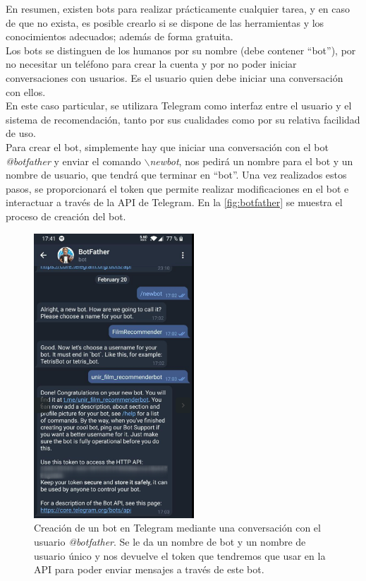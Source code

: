 En resumen, existen bots para realizar prácticamente cualquier tarea, y en caso de que no exista, es posible crearlo si se dispone de las herramientas y los conocimientos adecuados; además de forma gratuita.\\

Los bots se distinguen de los humanos por su nombre (debe contener ``bot''), por no necesitar un teléfono para crear la cuenta y por no poder iniciar conversaciones con usuarios. Es el usuario quien debe iniciar una conversación con ellos.\\

En este caso particular, se utilizara Telegram como interfaz entre el usuario y el sistema de recomendación, tanto por sus cualidades como por su relativa facilidad de uso.\\

Para crear el bot, simplemente hay que iniciar una conversación con el bot \textit{@botfather} y enviar el comando \textit{$\backslash$newbot}, nos pedirá un nombre para el bot y un nombre de usuario, que tendrá que terminar en ``bot''. Una vez realizados estos pasos, se proporcionará el token que permite realizar modificaciones en el bot e interactuar a través de la API de Telegram. En la \autoref{fig:botfather} se muestra el proceso de creación del bot.

\begin{figure}[H]
    \centering
    \captionsetup{width=8cm}
    \includegraphics[width=6cm]{contenido/imagenes/botfather.png}
    \caption{Creación de un bot en Telegram mediante una conversación con el usuario \textit{@botfather}. Se le da un nombre de bot y un nombre de usuario único y nos devuelve el token que tendremos que usar en la API para poder enviar mensajes a través de este bot.}
    \label{fig:botfather}
\end{figure}



